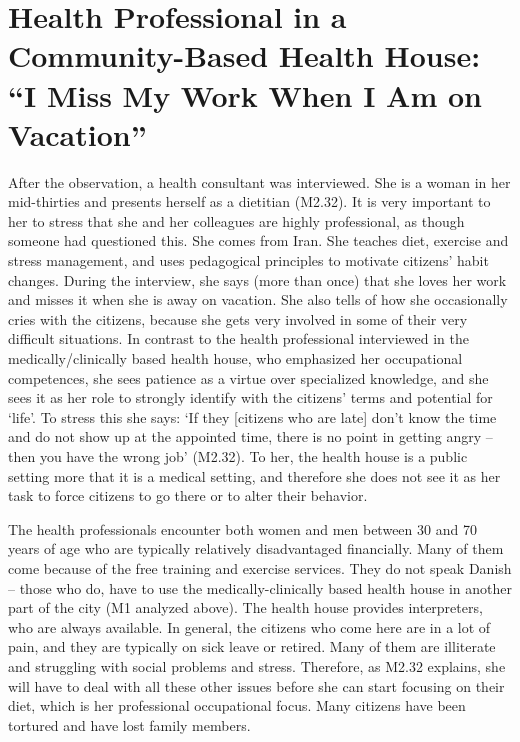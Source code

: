 \section{Health Professional in a Community-Based Health House: “I Miss My Work When I Am on Vacation”}
After the observation, a health consultant was interviewed. She is a woman in her mid-thirties and presents herself as a dietitian (M2.32). It is very important to her to stress that she and her colleagues are highly professional, as though someone had questioned this. She comes from Iran. She teaches diet, exercise and stress management, and uses pedagogical principles to motivate citizens’ habit changes. During the interview, she says (more than once) that she loves her work and misses it when she is away on vacation. She also tells of how she occasionally cries with the citizens, because she gets very involved in some of their very difficult situations. In contrast to the health professional interviewed in the medically/clinically based health house, who emphasized her occupational competences, she sees patience as a virtue over specialized knowledge, and she sees it as her role to strongly identify with the citizens’ terms and potential for ‘life’. To stress this she says: ‘If they [citizens who are late] don’t know the time and do not show up at the appointed time, there is no point in getting angry – then you have the wrong job’ (M2.32). To her, the health house is a public setting more that it is a medical setting, and therefore she does not see it as her task to force citizens to go there or to alter their behavior. 
\par
The health professionals encounter both women and men between 30 and 70 years of age who are typically relatively disadvantaged financially. Many of them come because of the free training and exercise services. They do not speak Danish – those who do, have to use the medically-clinically based health house in another part of the city (M1 analyzed above). The health house provides interpreters, who are always available. In general, the citizens who come here are in a lot of pain, and they are typically on sick leave or retired. Many of them are illiterate and struggling with social problems and stress. Therefore, as M2.32 explains, she will have to deal with all these other issues before she can start focusing on their diet, which is her professional occupational focus. Many citizens have been tortured and have lost family members. 
\par
